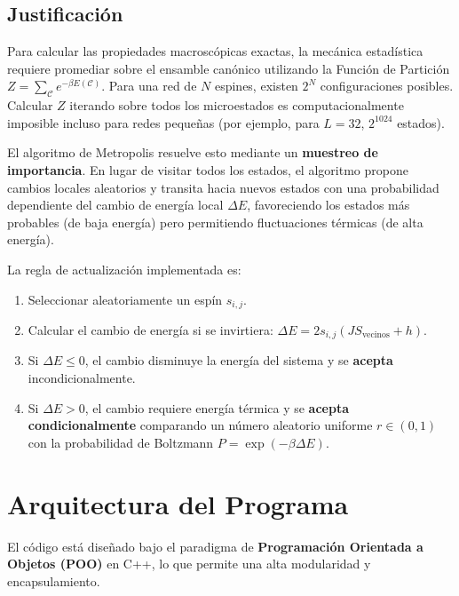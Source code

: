 \documentclass[11pt, a4paper]{article}
\begin{document}
\subsection*{Justificación}
Para calcular las propiedades macroscópicas exactas, la mecánica estadística requiere promediar sobre el ensamble canónico utilizando la Función de Partición $Z = \sum_{\mathcal{C}} e^{-\beta E(\mathcal{C})}$. Para una red de $N$ espines, existen $2^N$ configuraciones posibles. Calcular $Z$ iterando sobre todos los microestados es computacionalmente imposible incluso para redes pequeñas (por ejemplo, para $L=32$, $2^{1024}$ estados). 

El algoritmo de Metropolis resuelve esto mediante un \textbf{muestreo de importancia}. En lugar de visitar todos los estados, el algoritmo propone cambios locales aleatorios y transita hacia nuevos estados con una probabilidad dependiente del cambio de energía local $\Delta E$, favoreciendo los estados más probables (de baja energía) pero permitiendo fluctuaciones térmicas (de alta energía).

La regla de actualización implementada es:
\begin{enumerate}
    \item Seleccionar aleatoriamente un espín $s_{i,j}$.
    \item Calcular el cambio de energía si se invirtiera: $\Delta E = 2 s_{i,j} (J S_{\text{vecinos}} + h)$.
    \item Si $\Delta E \le 0$, el cambio disminuye la energía del sistema y se \textbf{acepta} incondicionalmente.
    \item Si $\Delta E > 0$, el cambio requiere energía térmica y se \textbf{acepta condicionalmente} comparando un número aleatorio uniforme $r \in (0,1)$ con la probabilidad de Boltzmann $P = \exp(-\beta \Delta E)$.
\end{enumerate}

\section{Arquitectura del Programa}
El código está diseñado bajo el paradigma de \textbf{Programación Orientada a Objetos (POO)} en C++, lo que permite una alta modularidad y encapsulamiento.
\end{document}
